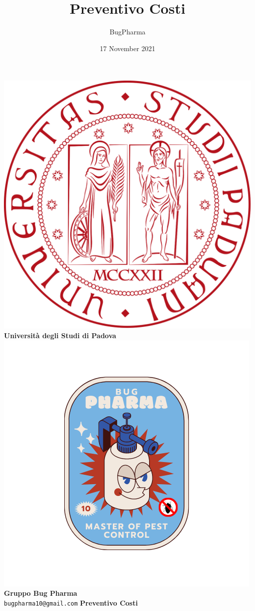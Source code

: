 \documentclass[11pt]{article}
\title{Preventivo Costi}
\author{BugPharma }
\date{17 November 2021}
\begin{document}
\thispagestyle{empty}
    \begin{titlepage}
        \begin{center}
            \includegraphics[scale = 0.05]{../Res/logo_unipd.png}\\
            \bigskip
            \large \textbf{Università degli Studi di Padova} \\
            \vfill
            \includegraphics[scale = 0.7]{../Res/BugPharma_Logo.png}\\
            \huge \textbf{Gruppo Bug Pharma} \\
            \vfill
            \large \texttt{bugpharma10@gmail.com}
            \vfill
            \Huge \textbf{Preventivo Costi}\\
            

\end{center}
\end{titlepage}
\end{document}

